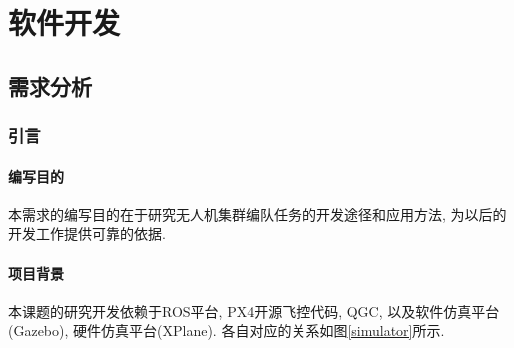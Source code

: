 \chapter{软件开发}
    \section{需求分析}
        \subsection{引言}
          \subsubsection{编写目的}
            本需求的编写目的在于研究无人机集群编队任务的开发途径和应用方法, 为以后的开发工作提供可靠的依据. 
          \subsubsection{项目背景}
            本课题的研究开发依赖于ROS平台, PX4开源飞控代码, QGC, 以及软件仿真平台(Gazebo), 硬件仿真平台(XPlane). 各自对应的关系如图\ref{simulator}所示. 
